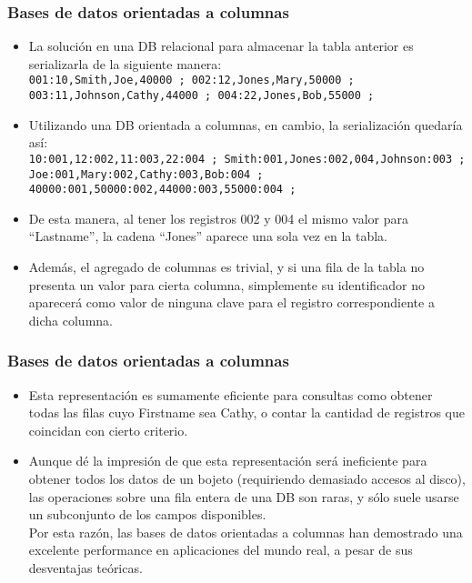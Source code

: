 \begin{frame}
\frametitle{Bases de datos orientadas a columnas}
\begin{itemize}
\item	La solución en una DB relacional para almacenar la tabla anterior es serializarla de la siguiente manera: \\
		\texttt{001:10,Smith,Joe,40000 ; 002:12,Jones,Mary,50000 ; 003:11,Johnson,Cathy,44000 ; 004:22,Jones,Bob,55000 ;}
		\pause
\item	Utilizando una DB orientada a columnas, en cambio, la serialización quedaría así: \\
		\texttt{10:001,12:002,11:003,22:004 ; Smith:001,Jones:002,004,Johnson:003 ; Joe:001,Mary:002,Cathy:003,Bob:004 ; 40000:001,50000:002,44000:003,55000:004 ;}
		\pause
\item	De esta manera, al tener los registros 002 y 004 el mismo valor para ``Lastname'', la cadena ``Jones'' aparece una sola vez en la tabla. \pause
\item	Además, el agregado de columnas es trivial, y si una fila de la tabla no presenta un valor para cierta columna, simplemente su identificador no aparecerá como valor de ninguna clave para el registro correspondiente a dicha columna. \pause
\end{itemize}
\end{frame}

\begin{frame}
\frametitle{Bases de datos orientadas a columnas}
\begin{itemize}
\item	Esta representación es sumamente eficiente para consultas como obtener todas las filas cuyo Firstname sea Cathy, o contar la cantidad de registros que coincidan con cierto criterio. \pause
\item	Aunque dé la impresión de que esta representación será ineficiente para obtener todos los datos de un bojeto (requiriendo demasiado accesos al disco), las operaciones sobre una fila entera de una DB son raras, y sólo suele usarse un subconjunto de los campos disponibles. \pause \\
		Por esta razón, las bases de datos orientadas a columnas han demostrado una excelente performance en aplicaciones del mundo real, a pesar de sus desventajas teóricas.
\end{itemize}
\end{frame}
